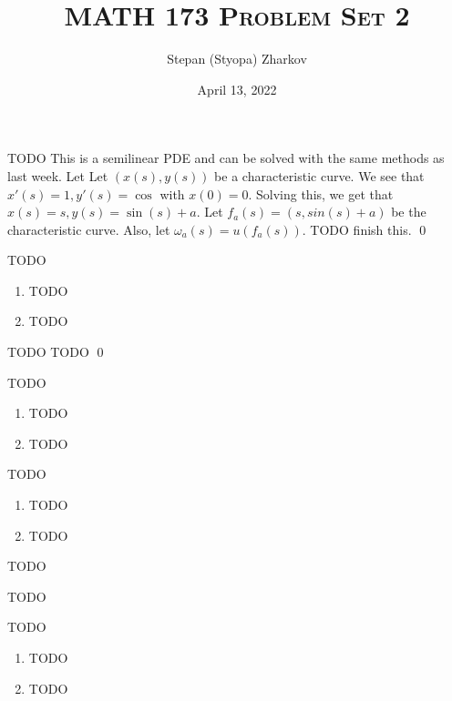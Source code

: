\documentclass{article}
\title{\textsc{MATH 173 Problem Set 2}}
\author{Stepan (Styopa) Zharkov}
\date{April 13, 2022}
\begin{document}
\maketitle
{} TODO
\hop
\solution
This is a semilinear PDE and can be solved with the same methods as last week. Let 
Let $(x(s), y(s))$ be a characteristic curve. We see that $x'(s) = 1, y'(s) = \cos$ with $x(0) = 0$. 
\hop
Solving this, we get that $x(s) = s, y(s) = \sin(s) + a$. Let $f_a(s) = (s, 
sin(s)+a)$ be the characteristic curve. Also, let $\omega_a(s) = u(f_a(s))$.  TODO finish this.
\qed


\newpage
{} TODO
\hop
\solution
\begin{enumerate}
    \item TODO
    \item TODO
\end{enumerate}


\newpage
{} TODO
\hop
\solution
TODO \qed


\newpage
{} TODO
\hop
\solution
\begin{enumerate}
    \item TODO
    \item TODO
\end{enumerate}


\newpage
{} TODO
\hop
\solution
\begin{enumerate}
    \item TODO
    \item TODO
\end{enumerate}


\newpage
{} TODO
\hop
\solution

TODO 


\newpage
{} TODO
\hop
\solution
\begin{enumerate}
    \item TODO
    \item TODO
\end{enumerate}
\end{document}
